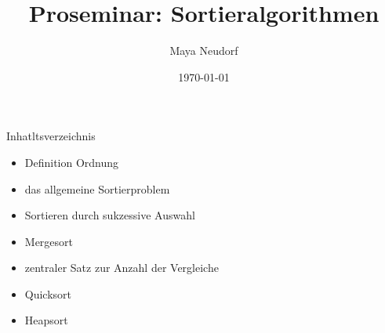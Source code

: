 \documentclass{beamer}
\title{Proseminar: Sortieralgorithmen}
\author{Maya Neudorf}
\date{\today}
\begin{document}
\begin{frame}
    \titlepage
\end{frame}
\begin{frame}{Inhatltsverzeichnis}
\begin{itemize}
    \item Definition Ordnung
    \item das allgemeine Sortierproblem
    \item Sortieren durch sukzessive Auswahl
    \item Mergesort
    \item zentraler Satz zur Anzahl der Vergleiche 
    \item Quicksort
    \item Heapsort
\end{itemize}
    
\end{frame}
\end{document}
